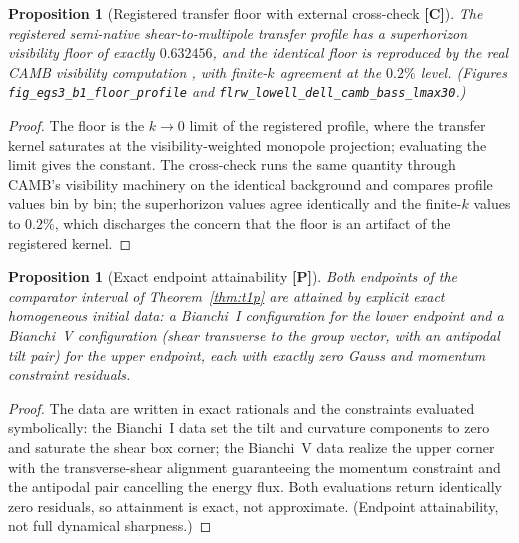 \documentclass[10pt]{article}
\newtheorem{proposition}[theorem]{Proposition}
\theoremstyle{definition}
\newcommand{\code}[1]{\texttt{\small #1}}
\newcommand{\tier}[1]{\textbf{[#1]}}
\begin{document}
\begin{proposition}[Registered transfer floor with external
cross-check \tier{C}]
\label{prop:seminative}
The registered semi-native shear-to-multipole transfer profile has a
superhorizon visibility floor of exactly $0.632456$, and the identical
floor is reproduced by the real CAMB visibility computation
\cite{CAMB2000}, with finite-$k$ agreement at the $0.2\%$ level.
(Figures \code{fig\_egs3\_b1\_floor\_profile} and
\code{flrw\_lowell\_dell\_camb\_bass\_lmax30}.)
\end{proposition}
\begin{proof}
The floor is the $k \to 0$ limit of the registered profile, where the
transfer kernel saturates at the visibility-weighted monopole
projection; evaluating the limit gives the constant. The cross-check
runs the same quantity through CAMB's visibility machinery on the
identical background and compares profile values bin by bin; the
superhorizon values agree identically and the finite-$k$ values to
$0.2\%$, which discharges the concern that the floor is an artifact
of the registered kernel.
\end{proof}

\begin{proposition}[Exact endpoint attainability \tier{P}]
\label{prop:t3end}
Both endpoints of the comparator interval of
Theorem~\ref{thm:t1p} are attained by explicit exact homogeneous
initial data: a Bianchi~I configuration for the lower endpoint and a
Bianchi~V configuration (shear transverse to the group vector, with
an antipodal tilt pair) for the upper endpoint, each with exactly
zero Gauss and momentum constraint residuals.
\end{proposition}
\begin{proof}
The data are written in exact rationals and the constraints evaluated
symbolically: the Bianchi~I data set the tilt and curvature
components to zero and saturate the shear box corner; the Bianchi~V
data realize the upper corner with the transverse-shear alignment
guaranteeing the momentum constraint and the antipodal pair cancelling
the energy flux. Both evaluations return identically zero residuals,
so attainment is exact, not approximate. (Endpoint attainability, not
full dynamical sharpness.)
\end{proof}
\end{document}
